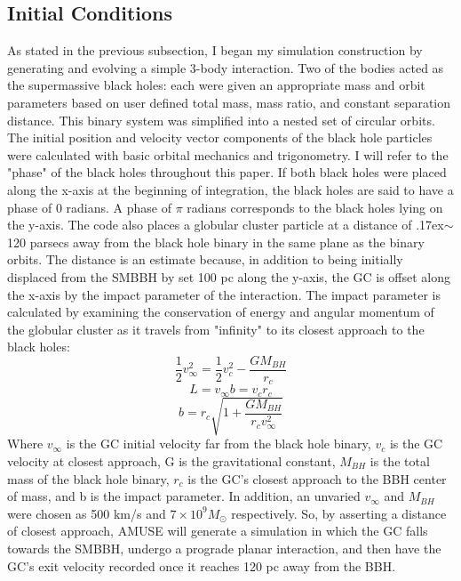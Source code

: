 \documentclass{aastex62}
\begin{document}
\subsection{Initial Conditions}
As stated in the previous subsection, I began my simulation construction by generating and evolving a simple 3-body interaction. Two of the bodies acted as the supermassive black holes: each were given an appropriate mass and orbit parameters based on user defined total mass, mass ratio, and constant separation distance. This binary system was simplified into a nested set of circular orbits. The initial position and velocity vector components of the black hole particles were calculated with basic orbital mechanics and trigonometry. I will refer to the "phase" of the black holes throughout this paper. If both black holes were placed along the x-axis at the beginning of integration, the black holes are said to have a phase of 0 radians. A phase of $\pi$ radians corresponds to the black holes lying on the y-axis. The code also places a globular cluster particle at a distance of {\raise.17ex\hbox{$\scriptstyle\mathtt{\sim}$}}120 parsecs away from the black hole binary in the same plane as the binary orbits. The distance is an estimate because, in addition to being initially displaced from the SMBBH by set 100 pc along the y-axis, the GC is offset along the x-axis by the impact parameter of the interaction. The impact parameter is calculated by examining the conservation of energy and angular momentum of the globular cluster as it travels from "infinity" to its closest approach to the black holes:
\begin{equation}
\frac{1}{2}v_{\infty}^2 = \frac{1}{2}v_{c}^2 - \frac{GM_{BH}}{r_{c}}
\end{equation}
\begin{equation}
L = v_{\infty}b = v_{c}r_{c}
\end{equation}
\begin{equation}
b = r_{c}\sqrt{1+\frac{GM_{BH}}{r_{c}v_{\infty}^2}}
\end{equation}
Where $v_{\infty}$ is the GC initial velocity far from the black hole binary, $v_{c}$ is the GC velocity at closest approach, G is the gravitational constant, $M_{BH}$ is the total mass of the black hole binary, $r_{c}$ is the GC's closest approach to the BBH center of mass, and b is the impact parameter.  In addition, an unvaried $v_{\infty}$ and $M_{BH}$ were chosen as 500 km/s and $7 \times 10^9 M_{\odot}$ respectively. So, by asserting a distance of closest approach, AMUSE will generate a simulation in which the GC falls towards the SMBBH, undergo a prograde planar interaction, and then have the GC's exit velocity recorded once it reaches 120 pc away from the BBH. 
\end{document}
